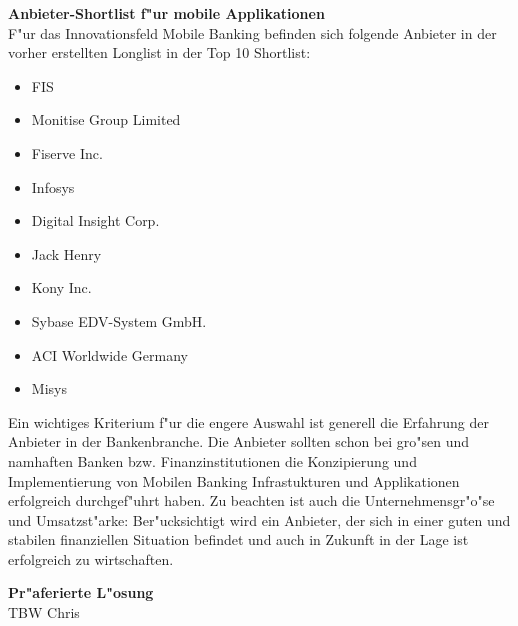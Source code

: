 \textbf{Anbieter-Shortlist f"ur mobile Applikationen}\\
F"ur das Innovationsfeld Mobile Banking befinden sich folgende Anbieter in der vorher erstellten Longlist in der Top 10 Shortlist:

\begin{itemize}
	\item FIS
	\item Monitise Group Limited
	\item Fiserve Inc.
	\item Infosys
	\item Digital Insight Corp.
	\item Jack Henry
	\item Kony Inc.
	\item Sybase EDV-System GmbH.
	\item ACI Worldwide Germany
	\item Misys
\end{itemize}

Ein wichtiges Kriterium f"ur die engere Auswahl ist generell die Erfahrung der Anbieter in der Bankenbranche. Die Anbieter sollten schon bei gro"sen und namhaften Banken bzw. Finanzinstitutionen die Konzipierung und Implementierung von Mobilen Banking Infrastukturen und Applikationen erfolgreich durchgef"uhrt haben. Zu beachten ist auch die Unternehmensgr"o"se und Umsatzst"arke: Ber"ucksichtigt wird ein Anbieter, der sich in einer guten und stabilen finanziellen Situation befindet und auch in Zukunft in der Lage ist erfolgreich zu wirtschaften.

\textbf{Pr"aferierte L"osung}\\
TBW Chris\\